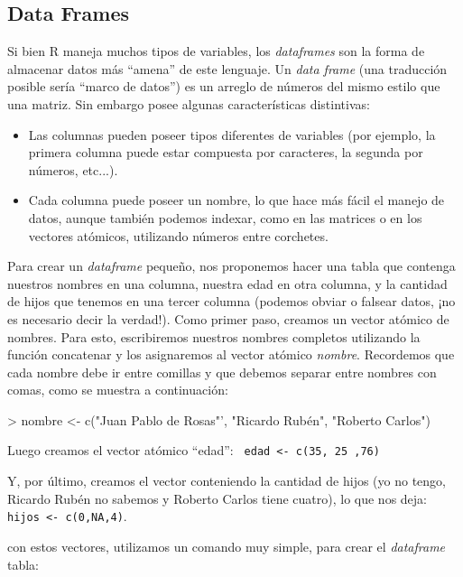 \documentclass[11pt,a4paper]{article}
\begin{document}
\subsection{Data Frames}

Si bien R maneja muchos tipos de variables, los \textit{dataframes} son la forma de almacenar datos más ``amena'' de este lenguaje. Un \textit{data frame} (una traducción posible sería ``marco de datos'') es un arreglo de números del mismo estilo que una matriz. Sin embargo posee algunas características distintivas:

\begin{itemize}
\item[$\bullet$] Las columnas pueden poseer tipos diferentes de variables (por ejemplo, la primera columna puede estar compuesta por caracteres, la segunda por números, etc...).

\item[$\bullet$] Cada columna puede poseer un nombre, lo que hace más fácil el manejo de datos, aunque también podemos indexar, como en las matrices o en los vectores atómicos, utilizando números entre corchetes. 
\end{itemize}

Para crear un \textit{dataframe} pequeño, nos proponemos hacer una tabla que contenga nuestros nombres en una columna, nuestra edad en otra columna, y la cantidad de hijos que tenemos en una tercer columna (podemos obviar o falsear datos, ¡no es necesario decir la verdad!). Como primer paso, creamos un vector atómico de nombres. Para esto, escribiremos nuestros nombres completos utilizando la función concatenar y los asignaremos al vector atómico \textit{nombre}. Recordemos que cada nombre debe ir entre comillas y que debemos separar entre nombres con comas, como se muestra a continuación:
\begin{Schunk}
\begin{Sinput}
> nombre <- c("Juan Pablo de Rosas"', "Ricardo Rubén", "Roberto Carlos")
\end{Sinput}
\end{Schunk}

Luego creamos el vector atómico ``edad'': \texttt{ edad <- c(35, 25 ,76)}

Y, por último, creamos el vector conteniendo la cantidad de hijos (yo no tengo, Ricardo Rubén no sabemos y Roberto Carlos tiene cuatro), lo que nos deja: \texttt{ hijos <- c(0,NA,4)}.

con estos vectores, utilizamos un comando muy simple, para crear el \textit{dataframe} tabla:
\end{document}
